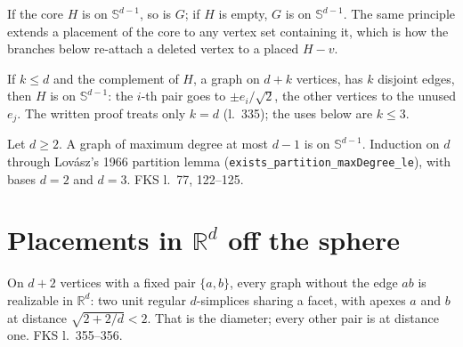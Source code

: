 \begin{corollary}
  \label{cor:degenerate}
  \leanok
  If the core $H$ is on $\mathbb{S}^{d-1}$, so is $G$; if $H$ is empty, $G$ is on
  $\mathbb{S}^{d-1}$. The same principle extends a placement of the core to any vertex set
  containing it, which is how the branches below re-attach a deleted vertex to a placed
  $H - v$.
\end{corollary}

\begin{lemma}
  \label{lem:cross}
  \leanok
  If $k \le d$ and the complement of $H$, a graph on $d + k$ vertices, has $k$ disjoint
  edges, then $H$ is on $\mathbb{S}^{d-1}$: the $i$-th pair goes to $\pm e_i/\sqrt 2$, the
  other vertices to the unused $e_j$. The written proof treats only $k = d$ (l.~335); the
  uses below are $k \le 3$.
\end{lemma}

\begin{proposition}
  \label{prop:maxdeg}
  \leanok
  Let $d \ge 2$. A graph of maximum degree at most $d - 1$ is on $\mathbb{S}^{d-1}$.
  Induction on $d$ through Lov\'asz's 1966 partition lemma (\texttt{exists\_partition\_maxDegree\_le}),
  with bases $d = 2$ and $d = 3$. FKS l.~77, 122--125.
\end{proposition}

\section{Placements in $\mathbb{R}^d$ off the sphere}

\begin{lemma}
  \label{lem:two-simplices}
  \leanok
  On $d + 2$ vertices with a fixed pair $\{a, b\}$, every graph without the edge $ab$ is
  realizable in $\mathbb{R}^d$: two unit regular $d$-simplices sharing a facet, with apexes
  $a$ and $b$ at distance $\sqrt{2 + 2/d} < 2$. That is the diameter; every other pair is at
  distance one. FKS l.~355--356.
\end{lemma}

